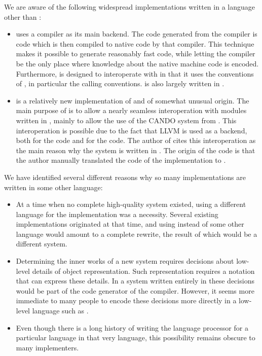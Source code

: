 We are aware of the following widespread implementations written in a
language other than \commonlisp{}:

\begin{itemize}
\item \ecl{} uses a \clanguage{} compiler as its main backend.  The
  code generated from the \ecl{} compiler is \clanguage{} code which
  is then compiled to native code by that \clanguage{} compiler.  This
  technique makes it possible to generate reasonably fast code, while
  letting the \clanguage{} compiler be the only place where knowledge
  about the native machine code is encoded.  Furthermore, \ecl{} is
  designed to interoperate with \clanguage{} in that it uses the
  conventions of \clanguage{}, in particular the \clanguage{} calling
  conventions.  \ecl{} is also largely written in \clanguage{}.
\item \clasp{} is a relatively new implementation of \commonlisp{} and
  of somewhat unusual origin.  The main purpose of \clasp{} is to
  allow a nearly seamless interoperation with modules written in
  \cplusplus{}, mainly to allow the use of the CANDO system from
  \commonlisp{}.  This interoperation is possible due to the fact that
  LLVM is used as a backend, both for the \cplusplus{} code and for
  the \commonlisp{} code.  The author of \clasp{} cites this
  interoperation as the main reason why the system is written in
  \cplusplus{}.  The origin of the \cplusplus{} code is that the
  author manually translated the \clanguage{} code of the \ecl{}
  \commonlisp{} implementation to \cplusplus{}.
\end{itemize}

We have identified several different reasons why so many \commonlisp{}
implementations are written in some other language:

\begin{itemize}
\item At a time when no complete high-quality \commonlisp{} system
  existed, using a different language for the implementation was a
  necessity.  Several existing implementations originated at that
  time, and using \commonlisp{} instead of some other language would
  amount to a complete rewrite, the result of which would be a
  different system.
\item Determining the inner works of a new \commonlisp{} system
  requires decisions about low-level details of object
  representation.  Such representation requires a notation that can
  express these details.  In a \commonlisp{} system written entirely
  in \commonlisp{} these decisions would be part of the code generator
  of the compiler.  However, it seems more immediate to many people to
  encode these decisions more directly in a low-level language such as
  \clanguage{}.
\item Even though there is a long history of writing the language
  processor for a particular language in that very language, this
  possibility remains obscure to many implementers.
\end{itemize}
